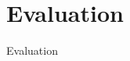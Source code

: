 \section{Evaluation}

\begin{frame}
\begin{center}
     	\huge Evaluation
     \end{center}
\end{frame}

\begin{frame}
	
\end{frame}

